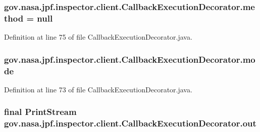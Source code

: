 \subsubsection[{\texorpdfstring{method}{method}}]{ gov.\+nasa.\+jpf.\+inspector.\+client.\+Callback\+Execution\+Decorator.\+method = null\hspace{0.3cm}{\ttfamily [protected]}}\hypertarget{classgov_1_1nasa_1_1jpf_1_1inspector_1_1client_1_1_callback_execution_decorator_a4c6a37dec58589fdd22ea4786d73752d}{}\label{classgov_1_1nasa_1_1jpf_1_1inspector_1_1client_1_1_callback_execution_decorator_a4c6a37dec58589fdd22ea4786d73752d}


Definition at line 75 of file Callback\+Execution\+Decorator.\+java.

\subsubsection[{\texorpdfstring{mode}{mode}}]{ gov.\+nasa.\+jpf.\+inspector.\+client.\+Callback\+Execution\+Decorator.\+mode\hspace{0.3cm}{\ttfamily [protected]}}\hypertarget{classgov_1_1nasa_1_1jpf_1_1inspector_1_1client_1_1_callback_execution_decorator_a1c94b5ff8b41a0d4fc5d6d872c2f20be}{}\label{classgov_1_1nasa_1_1jpf_1_1inspector_1_1client_1_1_callback_execution_decorator_a1c94b5ff8b41a0d4fc5d6d872c2f20be}


Definition at line 73 of file Callback\+Execution\+Decorator.\+java.

\subsubsection[{\texorpdfstring{out}{out}}]{\setlength{\rightskip}{0pt plus 5cm}final Print\+Stream gov.\+nasa.\+jpf.\+inspector.\+client.\+Callback\+Execution\+Decorator.\+out\hspace{0.3cm}{\ttfamily [protected]}}\hypertarget{classgov_1_1nasa_1_1jpf_1_1inspector_1_1client_1_1_callback_execution_decorator_a30138942cde8b1d228acac772187354c}{}\label{classgov_1_1nasa_1_1jpf_1_1inspector_1_1client_1_1_callback_execution_decorator_a30138942cde8b1d228acac772187354c}


